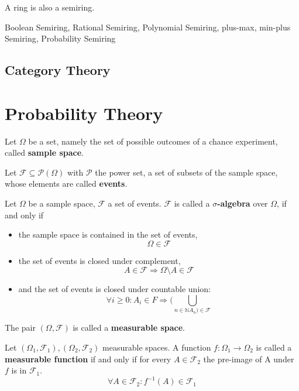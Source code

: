             \begin{definition}[Ring]
            \end{definition}
            
            \begin{corollary}
            A ring is also a semiring.
            \end{corollary}
                        
            \begin{example}
            Boolean Semiring, Rational Semiring, Polynomial Semiring, plus-max, min-plus Semiring, Probability Semiring
            \end{example}

        \subsection{Category Theory}
        
        \begin{definition}
        \end{definition}
        

    \section{Probability Theory}\label{\positionnumber}
        \begin{definition}
        Let $\Omega$ be a set, namely the set of possible outcomes of a chance experiment, called \textbf{sample space}.
        
        Let $\mathcal{F} \subseteq \mathcal{P}(\Omega)$ with $\mathcal{P}$ the power set, a set of subsets of the sample space, whose elements are called \textbf{events}.
        
        Let $\Omega$ be a sample space, $\mathcal{F}$ a set of events.
        $\mathcal{F}$ is called a \textbf{$\sigma$-algebra} over $\Omega$, if and only if
        \begin{itemize}
        \item the sample space is contained in the set of events,
        \[ \Omega \in \mathcal{F} \]
        \item the set of events is closed under complement,
        \[ A \in \mathcal{F} \Rightarrow \Omega \setminus A \in \mathcal F \]
        \item and the set of events is closed under countable union:
        \[ \forall i \geq 0: A_i \in F \Rightarrow (\bigcup_{n \in \mathbb{N} A_n) \in \mathcal{F}} \]
        \end{itemize}
        
        The pair $\left( \Omega, \mathcal{F} \right)$ is called a \textbf{measurable space}.

        Let $\left( \Omega_1, \mathcal{F}_1 \right), \left( \Omega_2, \mathcal{F}_2 \right)$ measurable spaces. A function $f: \Omega_1 \rightarrow \Omega_2$ is called a \textbf{measurable function} if and only if for every $A \in \mathcal{F}_2$ the pre-image of A under $f$ is in $\mathcal{F}_1$.
        \[ \forall A \in \mathcal{F}_2: f^{-1}(A) \in \mathcal{F}_1 \]
        \end{definition}

